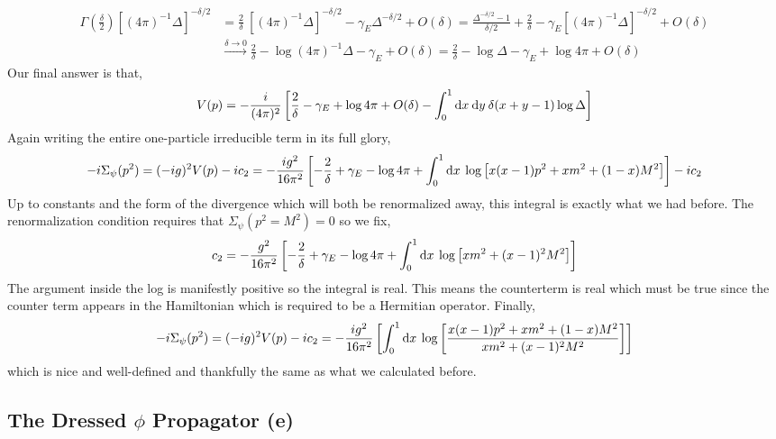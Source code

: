 \documentclass{article}
\begin{document}
\begin{align*} 
\Gamma\left(\tfrac{\delta}{2}\right) \left[(4 \pi)^{-1} \Delta \right]^{- \delta / 2}
& = \frac{2}{\delta} \: \left[(4 \pi)^{-1} \Delta \right]^{- \delta / 2} - \gamma_E \Delta^{- \delta / 2} + O(\delta) = \frac{\Delta^{-\delta/2} - 1}{\delta/2} + \frac{2}{\delta} - \gamma_E \left[(4 \pi)^{-1} \Delta \right]^{- \delta / 2} + O(\delta)
\\
&  \xrightarrow{\delta \to 0} \frac{2}{\delta} - \log{(4 \pi)^{-1} \Delta} - \gamma_E  + O(\delta) = \frac{2}{\delta} - \log{\Delta} - \gamma_E + \log{4 \pi} + O(\delta)
\end{align*}
Our final answer is that,
\begin{align*}
 V(p) = -\frac{i}{(4 \pi)^2} \left[ \frac{2}{\delta} - \gamma_E + \log{4 \pi} + O(\delta) -  \int_{0}^{1} \mathrm{d}x \: \mathrm{d}y \: \delta(x + y - 1) \log{\Delta} \right]
\end{align*}
Again writing the entire one-particle irreducible term in its full glory,
\[ - i \Sigma_\psi(p^2) = (-ig)^2 V(p) - i c_2 = -\frac{ig^2}{16 \pi^2} \left[ - \frac{2}{\delta} + \gamma_E - \log{4 \pi} + \int_{0}^{1} \mathrm{d}x \: \log{\left[ x(x - 1) p^2 + x m^2 + (1 - x) M^2 \right]} \right] - i c_2 \]
Up to constants and the form of the divergence which will both be renormalized away, this integral is exactly what we had before. 
The renormalization condition requires that $\Sigma_\psi(p^2 = M^2) = 0$ so we fix,
\[ c_2 = -\frac{g^2}{16 \pi^2} \left[ - \frac{2}{\delta} + \gamma_E - \log{4 \pi} + \int_{0}^{1} \mathrm{d}x \:   \log{\left[ x m^2 + (x - 1)^2 M^2 \right]} \right] \]
The argument inside the log is manifestly positive so the integral is real. This means the counterterm is real which must be true since the counter term appears in the Hamiltonian which is required to be a Hermitian operator. Finally,
\[ - i \Sigma_\psi(p^2) = (-ig)^2 V(p) - i c_2 = - \frac{ig^2}{16 \pi^2} \left[ \int_{0}^{1} \mathrm{d}x \: \log{\left[\frac{ x(x - 1) p^2 + x m^2 + (1 - x) M^2}{x m^2 + (x - 1)^2 M^2} \right]} \right] \]
which is nice and well-defined and thankfully the same as what we calculated before.

\subsection{The Dressed $\phi$ Propagator (e)}
\end{document}
